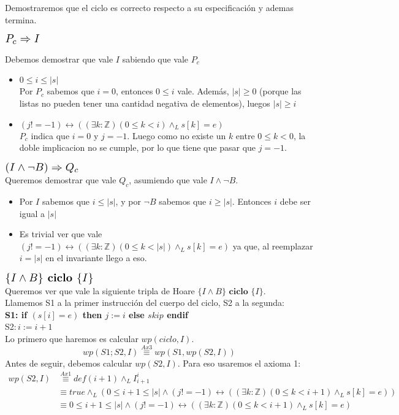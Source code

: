 \documentclass[a4paper]{article}
\begin{document}
Demostraremos que el ciclo es correcto respecto a su especificación y ademas termina.
	\begin{flushleft}$\scalebox{1.3}{$P_c\Rightarrow I$}$\end{flushleft}
	Debemos demostrar que vale $I$ sabiendo que vale $P_c$ 
	\begin{itemize}
		\item $ 0\leq i\leq |s|$\smallskip \\
		Por $P_c$ sabemos que $i=0$, entonces $0\leq i $ vale. Además, $|s|\geq 0$ (porque las listas no pueden tener una cantidad 
		negativa de elementos), luegos $|s|\geq i$
		\item $ (j!=-1)\leftrightarrow ((\exists k:\mathbb{Z})(0\leq k<i)\wedge_L s[k]=e)$\smallskip \\
		$P_c$ indica que $i=0$ y $j=-1$. Luego como no existe un $k$ entre $0\leq k <0$, la doble implicacion no se cumple, por lo
		 que tiene que pasar que $j=-1$.
	\end{itemize}	 
	$\scalebox{1.3}{$(I\wedge \neg B)\Rightarrow Q_c$}$\smallskip \\
	Queremos demostrar que vale $Q_c$, asumiendo que vale  $I\wedge \neg B$.
	\begin{itemize}
	\item Por $I$ sabemos que $i\leq |s|$, y por $\neg B$ sabemos que $i\geq |s|$. Entonces $i$ debe ser igual a $|s|$
	\item Es trivial ver que vale $ (j!=-1)\leftrightarrow ((\exists k:\mathbb{Z})(0\leq k<|s|)\wedge_L s[k]=e)$ ya que, al reemplazar
	 $i=|s|$ en el invariante llego a eso.
	\end{itemize}
	$\scalebox{1.3}{$\{I\wedge B\} \textbf{ ciclo } \{I\}$}$\medskip \\
	Queremos ver que vale la siguiente tripla de Hoare $\{I\wedge B\} \textbf{ ciclo } \{I\}$.\\
	Llamemos S1 a la primer instrucción del cuerpo del ciclo, S2 a la segunda:\\
	\textbf{S1: if $(s[i]=e)$ then $j:=i$ else $skip$ endif}\\
	S2$: i:=i+1$\\
	Lo primero que haremos es calcular $wp(ciclo,I)$.
	\begin{equation}wp(S1;S2,I)\stackrel{Ax3}{\equiv}wp(S1,wp(S2,I))\end{equation}
	Antes de seguir, debemos calcular $wp(S2,I)$. Para eso usaremos el axioma 1:
	\begin{align*}
	wp(S2,I)&\stackrel{Ax1}{\equiv}def(i+1)\wedge_L I_{i+1}^{i}\\
		&\equiv true\wedge_L (0\leq i+1\leq|s|\wedge (j!=-1)\leftrightarrow ((\exists k:\mathbb{Z})(0\leq k<i+1)\wedge_L s[k]=e))\\
		&\equiv 0\leq i+1\leq|s|\wedge (j!=-1)\leftrightarrow ((\exists k:\mathbb{Z})(0\leq k<i+1)\wedge_L s[k]=e)
	\end{align*}
\end{document}

